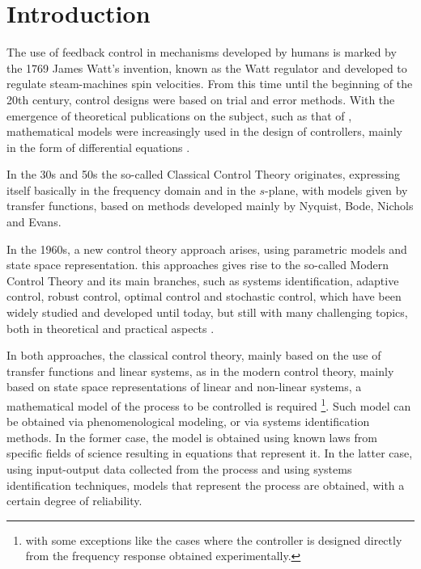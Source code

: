 
\chapter{Introduction}
\label{cap1} \vspace{-1cm}

%
The use of feedback control in mechanisms developed by humans is marked by the 1769 James Watt's invention, known as the Watt regulator and developed to regulate steam-machines spin velocities.
From this time until the beginning of the 20th century, control designs were based on trial and error methods. With the emergence of theoretical publications on the subject, such as that of \citep{tolle1921}, mathematical models were increasingly used in the design of controllers, mainly in the form of differential equations \citep{takahashi1972}.

In the 30s and 50s the so-called Classical Control Theory originates, expressing itself basically in the frequency domain and in the $s$-plane, with models given by transfer functions, based on methods developed mainly by Nyquist, Bode, Nichols and Evans.

In the 1960s, a new control theory approach arises, using parametric models and state space representation. this approaches gives rise to the so-called Modern Control Theory and its main branches, such as systems identification, adaptive control, robust control, optimal control and stochastic control, which have been widely studied and developed until today, but still with many challenging topics, both in theoretical and practical aspects \citep{hou2013}.

In both approaches, the classical control theory, mainly based on the use of transfer functions and linear systems, as in the modern control theory, mainly based on state space representations of linear and non-linear systems, a mathematical model of the process to be controlled is required
\footnote{with some exceptions like the cases where the controller is designed directly from the frequency response obtained experimentally.}.
Such model can be obtained via phenomenological modeling, or via systems identification methods. In the former case, the model is obtained using known laws from specific fields of science resulting in equations that represent it. In the latter case, using input-output data collected from the process and using systems identification techniques, models that represent the process are obtained, with a certain degree of reliability.

